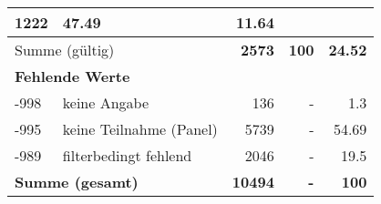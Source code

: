 \begin{longtable}{lXrrr}
       \num{1222} &
       \num[round-mode=places,round-precision=2]{47.49} &
         \num[round-mode=places,round-precision=2]{11.64} \\
     \midrule
     \multicolumn{2}{l}{Summe (gültig)} &
       \textbf{\num{2573}} &
     \textbf{\num{100}} &
       \textbf{\num[round-mode=places,round-precision=2]{24.52}} \\
     \multicolumn{5}{l}{\textbf{Fehlende Werte}}\\
       -998 &
       keine Angabe &
         \num{136} &
        - &
         \num[round-mode=places,round-precision=2]{1.3} \\
       -995 &
       keine Teilnahme (Panel) &
         \num{5739} &
        - &
         \num[round-mode=places,round-precision=2]{54.69} \\
       -989 &
       filterbedingt fehlend &
         \num{2046} &
        - &
         \num[round-mode=places,round-precision=2]{19.5} \\
     \midrule
     \multicolumn{2}{l}{\textbf{Summe (gesamt)}} &
          \textbf{\num{10494}} &
        \textbf{-} &
        \textbf{\num{100}} \\
     \bottomrule
     \end{longtable}
     

